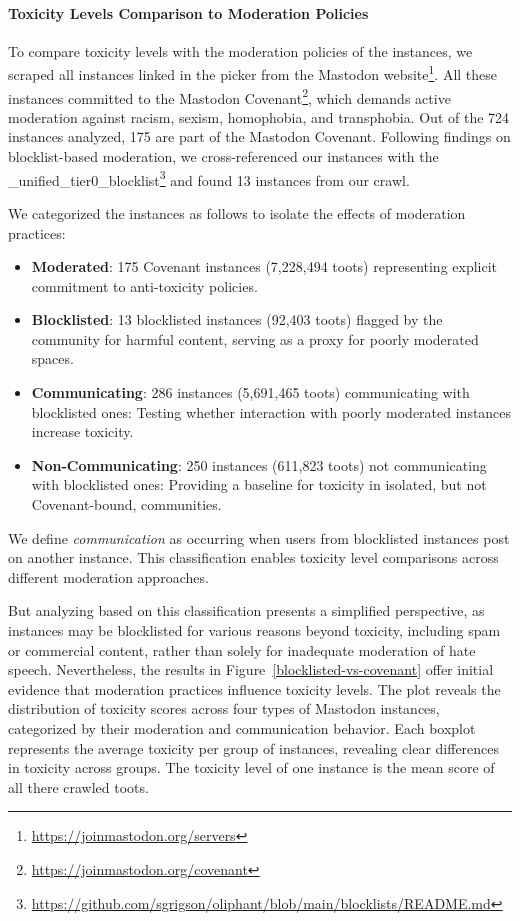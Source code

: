 \paragraph{Toxicity Levels Comparison to Moderation Policies}

To compare toxicity levels with the moderation policies of the instances, we scraped all instances linked in the picker from the Mastodon website\footnote{\url{https://joinmastodon.org/servers}}. All these instances committed to the Mastodon Covenant\footnote{\url{https://joinmastodon.org/covenant}}, which demands active moderation against racism, sexism, homophobia, and transphobia. Out of the 724 instances analyzed, 175 are part of the Mastodon Covenant. Following \citet{bono:2024} findings on blocklist-based moderation, we cross-referenced our instances with the \_unified\_tier0\_blocklist\footnote{\url{https://github.com/sgrigson/oliphant/blob/main/blocklists/README.md}} and found 13 instances from our crawl. 

We categorized the instances as follows to isolate the effects of moderation practices:
\begin{itemize}
\item \textbf{Moderated}: 175 Covenant instances (7,228,494 toots) representing explicit commitment to anti-toxicity policies.
\item \textbf{Blocklisted}: 13 blocklisted instances (92,403 toots) flagged by the community for harmful content, serving as a proxy for poorly moderated spaces.
\item \textbf{Communicating}: 286 instances (5,691,465 toots) communicating with blocklisted ones: Testing whether interaction with poorly moderated instances increase toxicity.
\item \textbf{Non-Communicating}: 250 instances (611,823 toots) not communicating with blocklisted ones: Providing a baseline for toxicity in isolated, but not Covenant-bound, communities.
\end{itemize}

We define \emph{communication} as occurring when users from blocklisted instances post on another instance. This classification enables toxicity level comparisons across different moderation approaches. 

But analyzing based on this classification presents a simplified perspective, as instances may be blocklisted for various reasons beyond toxicity, including spam or commercial content, rather than solely for inadequate moderation of hate speech. Nevertheless, the results in Figure~\ref{blocklisted-vs-covenant} offer initial evidence that moderation practices influence toxicity levels. The plot reveals the distribution of toxicity scores across four types of Mastodon instances, categorized by their moderation and communication behavior. Each boxplot represents the average toxicity per group of instances, revealing clear differences in toxicity across groups. The toxicity level of one instance is the mean score of all there crawled toots.

